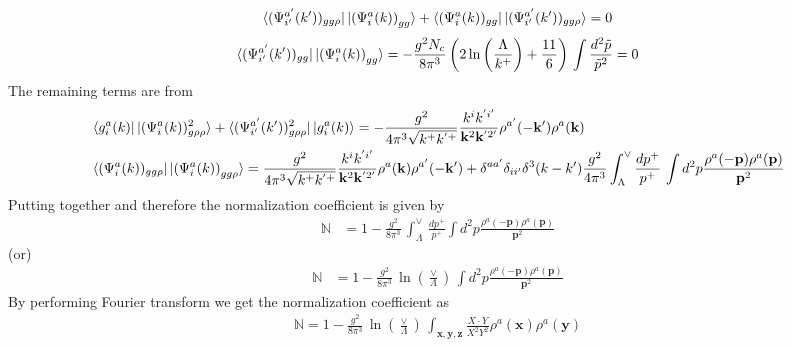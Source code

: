\documentclass[aps,prd,amsmath,amssymb,nofootinbib]{revtex4-2}
\def\mf#1{\mathbb{#1}}
\def\v#1{\mathbf{#1}}
\numberwithin{equation}{section}
\begin{document}
$$\bra{(\Psi^{a'}_{i'}(k'))_{gg\rho} }\ket{ \left(\Psi^{a}_{i}(k) \right)_{gg} } + \bra{(\Psi^{a}_{i}(k))_{gg} }\ket{(\Psi^{a'}_{i'}(k'))_{gg\rho} } = 0 $$
$$\bra{(\Psi^{a'}_{i'}(k'))_{gg} }\ket{ \left(\Psi^{a}_{i}(k) \right)_{gg} } = -\frac{g^2N_c}{8\pi^3} \left(  2 \ln \bigg(\frac{\Lambda}{k^{+}} \bigg) + \frac{11}{6}  \right) \,\int \frac{d^2\tilde p}{\tilde p^2} = 0 $$
The remaining terms are from
\begin{align}
   & \bra{g^{a}_{i}(k)}\ket{(\Psi^{a}_{i}(k))^{2}_{g\rho\rho} } + \bra{(\Psi^{a'}_{i'}(k'))^{2}_{g\rho\rho} }\ket{g^{a}_{i}(k)}  = -\frac{g^2}{4 \pi^3 \sqrt{k^+ k^{'+}}} \frac{k^{i} k^{'i'}}{\v{k}^2\v{k}^{'2'}} \rho^{a'} (-\v{k}') \rho^a (\v{k}) \notag \\ & \bra{(\Psi^{a}_{i}(k))_{gg\rho} }\ket{ \left(\Psi^{a}_{i}(k) \right)_{gg\rho} } = \frac{g^2}{4 \pi^3 \sqrt{k^+ k^{'+}}} \frac{k^{i} k^{'i'}}{\v{k}^2\v{k}^{'2'}}\rho^a (\v{k}) \rho^{a'} (-\v{k}')+ 
 \delta^{a a'} \delta_{i i'}  \delta^3(k-k')  
  \frac{g^2}{4 \pi^3 } \int_{\Lambda}^{\vee} \frac{dp^{+}}{p^{+}}\,
  \int d^2p \frac{\rho^a(-\v{p}) \rho^a(\v{p})}{\v{p}^2} \nonumber
\end{align}
Putting together and therefore the normalization coefficient is given by 
\begin{align}
\mf{N} & =  
 1 - \frac{g^2}{8 \pi^3 }\, \int_{\Lambda}^{\vee}\,\frac{dp^{+}}{p^{+}}
\int d^2p \frac{\rho^a(-\v{p}) \rho^a(\v{p})}{\v{p}^2}
\end{align}
(or)
\begin{align}
\mf{N} & =  
 1 - \frac{g^2}{8 \pi^3 }\,\ln\left(\frac{\vee}{\Lambda}\right)\,
\int d^2p \frac{\rho^a(-\v{p}) \rho^a(\v{p})}{\v{p}^2}
\end{align}
By performing Fourier transform we get the normalization coefficient as
\begin{align}
\mf{N} =  
 1 - \frac{g^2}{8 \pi^3 }\,\ln\left(\frac{\vee}{\Lambda}\right)\, 
  \int_{\v{x}, \v{y},\v{z}} \frac{X\cdot Y}{X^2 Y^2}   \rho^a(\v{x}) \rho^a(\v{y})
\end{align}
\newpage
\end{document}

